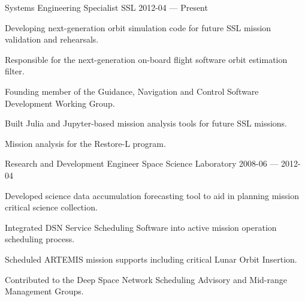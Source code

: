 


\begin{cventries}

  \cventry
    {Systems Engineering Specialist} %
    {SSL} %
    {} %
    {2012-04 — Present} %
    {
      \begin{cvitems} %
        \item {Developing next-generation orbit simulation code for future SSL mission validation and rehearsals.}
        \item {Responsible for the next-generation on-board flight software orbit estimation filter.}
        \item {Founding member of the Guidance, Navigation and Control Software Development Working Group.}
        \item {Built Julia and Jupyter-based mission analysis tools for future SSL missions.}
        \item {Mission analysis for the Restore-L program.}
      \end{cvitems}
    }


  \cventry
    {Research and Development Engineer} %
    {Space Science Laboratory} %
    {} %
    {2008-06 — 2012-04} %
    {
      \begin{cvitems} %
        \item {Developed science data accumulation forecasting tool to aid in planning mission critical science collection.}
        \item {Integrated DSN Service Scheduling Software into active mission operation scheduling process.}
        \item {Scheduled ARTEMIS mission supports including critical Lunar Orbit Insertion.}
        \item {Contributed to the Deep Space Network Scheduling Advisory and Mid-range Management Groups.}
      \end{cvitems}
    }



\end{cventries}
